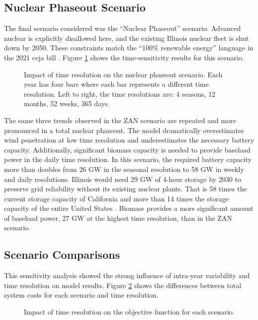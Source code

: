 \subsection{Nuclear Phaseout Scenario}
The final scenario considered was the ``Nuclear Phaseout'' scenario. Advanced
nuclear is explicitly disallowed here, and the existing Illinois nuclear fleet is shut down by
2050. These constraints match the ``100\% renewable energy'' language in the 2021
\gls{ceja} bill \cite{harmon_climate_2021}. Figure \ref{fig:time_res_ZN} shows
the time-sensitivity results for this scenario.

\begin{figure}[H]
  \centering
  \resizebox{0.95\columnwidth}{!}{}
  \caption{Impact of time resolution on the nuclear phaseout scenario.  Each
  year has four bars where each bar represents a different time resolution.
  Left to right, the time resolutions are: 4 seasons, 12 months, 52 weeks, 365 days.}
  \label{fig:time_res_ZN}
\end{figure}

The same three trends observed in the ZAN scenario are repeated and
more pronounced in a total nuclear phaseout. The model dramatically overestimates
wind penetration at low time resolution and underestimates the necessary battery capacity.
Additionally, significant biomass capacity is needed to provide baseload
power in the daily time resolution.
In this scenario, the required battery capacity more than doubles from 26 GW in the
seasonal resolution to 58 GW in weekly and daily resolutions. Illinois would need 29 GW of 4-hour
storage by 2030 to preserve grid reliability without its existing nuclear plants.
That is 58 times the current storage capacity of California and more than
14 times the storage capacity of the entire United States
\cite{hutchins_us_2021}.
Biomass provides a more significant amount of baseload power, 27 GW at the highest
time resolution, than in the ZAN scenario.

\subsection{Scenario Comparisons}
This sensitivity analysis showed the strong influence of intra-year variability
and time resolution on model results.
Figure \ref{fig:time_res_cost} shows the differences between total system costs
for each scenario and time resolution.


\begin{figure}[H]
  \centering
  \resizebox{0.75\columnwidth}{!}{}
  \caption{Impact of time resolution on the objective function for each scenario.}
  \label{fig:time_res_cost}
\end{figure}

